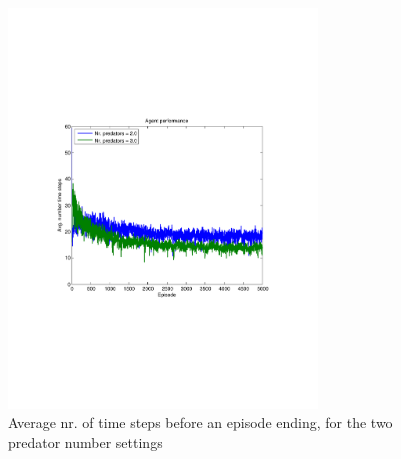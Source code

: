 \begin{figure}[hbt]
\centering
\includegraphics[bb = 0.6in 3in 7.9in 8in,clip,width=0.73\textwidth]{IQLnrTimeSteps5000episodesavg200trials.pdf} 
\caption{Average nr. of time steps before an episode ending, for the two predator number settings}
\label{fig:IQLnrTimeSteps2}
\end{figure}


\clearpage